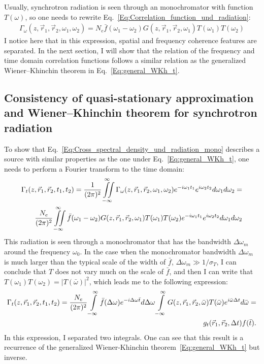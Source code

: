     Usually, synchrotron radiation is seen through an monochromator with  function $T(\omega)$, so one needs to rewrite Eq.~\ref{Eq:Correlation_function_und_radiation}: 
    \begin{align}
        \Gamma_\omega (z, \vec{r}_1, \vec{r}_2, \omega_1, \omega_2) = N_e \bar{f}(\omega_1 - \omega_2) G(z, \vec{r}_1, \vec{r}_2, \omega_1) T(\omega_1) T(\omega_2)
        \label{Eq:Cross_spectral_density_und_radiation_mono}
    \end{align}
    I notice here that in this expression, spatial and frequency coherence features are separated. In the next section, I will show that the relation of the frequency and time domain correlation functions follows a similar relation as the generalized Wiener–Khinchin theorem in Eq.~\ref{Eq:general_WKh_t}.
    
\subsection{Consistency of quasi-stationary approximation and Wiener–Khinchin theorem for synchrotron radiation}
    
    To show that Eq.~\ref{Eq:Cross_spectral_density_und_radiation_mono} describes a source with similar properties as the one under Eq.~\ref{Eq:general_WKh_t}, one needs to perform a Fourier transform to the time domain:
    \begin{align}
        \Gamma_t(z, \vec{r}_1, \vec{r}_2, t_1, t_2) = 
        \frac{1}{(2 \pi)^2}\iint \limits_{-\infty}^{\infty} \Gamma_\omega (z, \vec{r}_1, \vec{r}_2, \omega_1, \omega_2) e^{-i\omega_1 t_1} e^{i\omega_2 t_2} d\omega_1 d\omega_2 = \cr
        \frac{N_e}{(2 \pi)^2}\iint \limits_{-\infty}^{\infty} \bar{f}(\omega_1 - \omega_2) G(z, \vec{r}_1, \vec{r}_2, \omega_1) T(\omega_1) T(\omega_2) e^{-i\omega_1 t_1} e^{i\omega_2 t_2} d\omega_1 d\omega_2
    \end{align}
    This radiation is seen through a monochromator that has the bandwidth $\Delta \omega_m$ around the frequency $\omega_0$. In the case when the monochromator bandwidth $\Delta \omega_m$ is much larger than the typical scale of the width of $\bar{f}$, $\Delta \omega_m \gg 1/\sigma_T$, I can conclude that $T$ does not vary much on the scale of $\bar{f}$, and then I can write that $T(\omega_1) T(\omega_2) = |T(\bar{\omega})|^2$, which leads me to the following expression:
    \begin{align}
        \Gamma_t(z, \vec{r}_1, \vec{r}_2, t_1, t_2) = 
        \frac{N_e}{(2 \pi)^2}\int \limits_{-\infty}^{\infty} \bar{f}(\Delta \omega) e^{-i\Delta \omega \bar{t}}d\Delta \omega \int \limits_{-\infty}^{\infty} G(z, \vec{r}_1, \vec{r}_2,\bar{\omega}) T(\bar{\omega}) e^{i\bar{\omega} \Delta t}d\bar{\omega} = \cr
        g_t(\vec{r}_1, \vec{r}_2, \Delta t) f(\bar{t}).
    \end{align}
    In this expression, I separated two integrals. One can see that this result is a recurrence of the generalized Wiener-Khinchin theorem~\ref{Eq:general_WKh_t} but inverse.


